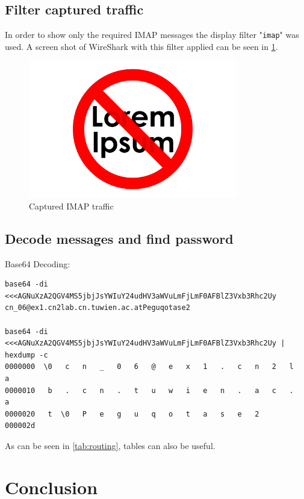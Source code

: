 \documentclass[parskip=full]{scrartcl}
\begin{document}
\subsection{Filter captured traffic}
In order to show only the required IMAP messages the display filter "\verb|imap|" was used. A screen shot of WireShark with this filter applied can be seen in \cref{fig:ws}. 

\begin{figure}[!ht]
	\centering %
	\includegraphics[height=6cm]{images/loremipsum.png} %
	\caption{Captured IMAP traffic} 
	\label{fig:ws} %
\end{figure} 

\subsection{Decode messages and find password}

Base64 Decoding:
\begin{verbatim}
base64 -di <<<AGNuXzA2QGV4MS5jbjJsYWIuY24udHV3aWVuLmFjLmF0AFBlZ3Vxb3Rhc2Uy
cn_06@ex1.cn2lab.cn.tuwien.ac.atPeguqotase2

base64 -di <<<AGNuXzA2QGV4MS5jbjJsYWIuY24udHV3aWVuLmFjLmF0AFBlZ3Vxb3Rhc2Uy | hexdump -c
0000000  \0   c   n   _   0   6   @   e   x   1   .   c   n   2   l   a
0000010   b   .   c   n   .   t   u   w   i   e   n   .   a   c   .   a
0000020   t  \0   P   e   g   u   q   o   t   a   s   e   2            
000002d
\end{verbatim}



As can be seen in \cref{tab:routing}, tables can also be useful.
\section{Conclusion}
\end{document}
